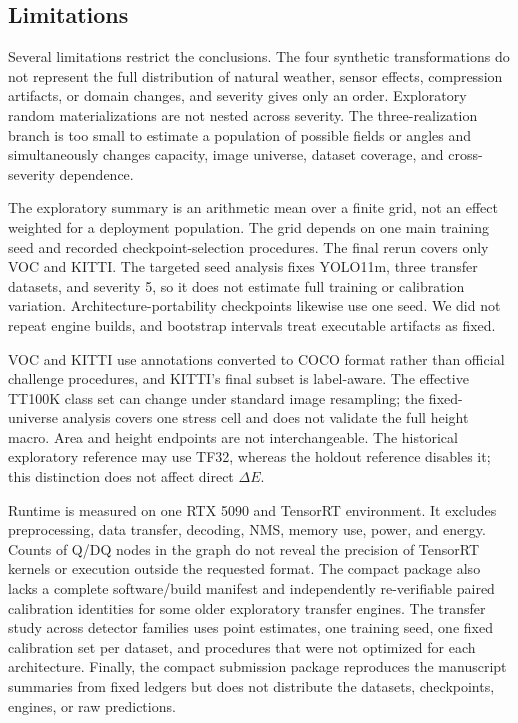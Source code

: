\documentclass[a4paper,fleqn]{cas-dc}
\begin{document}
\subsection{Limitations}

Several limitations restrict the conclusions. The four synthetic transformations do not represent the full distribution of natural weather, sensor effects, compression artifacts, or domain changes, and severity gives only an order. Exploratory random materializations are not nested across severity. The three-realization branch is too small to estimate a population of possible fields or angles and simultaneously changes capacity, image universe, dataset coverage, and cross-severity dependence.

The exploratory summary is an arithmetic mean over a finite grid, not an effect weighted for a deployment population. The grid depends on one main training seed and recorded checkpoint-selection procedures. The final rerun covers only VOC and KITTI. The targeted seed analysis fixes YOLO11m, three transfer datasets, and severity 5, so it does not estimate full training or calibration variation. Architecture-portability checkpoints likewise use one seed. We did not repeat engine builds, and bootstrap intervals treat executable artifacts as fixed.

VOC and KITTI use annotations converted to COCO format rather than official challenge procedures, and KITTI's final subset is label-aware. The effective TT100K class set can change under standard image resampling; the fixed-universe analysis covers one stress cell and does not validate the full height macro. Area and height endpoints are not interchangeable. The historical exploratory reference may use TF32, whereas the holdout reference disables it; this distinction does not affect direct $\Delta E$.

Runtime is measured on one RTX 5090 and TensorRT environment. It excludes preprocessing, data transfer, decoding, NMS, memory use, power, and energy. Counts of Q/DQ nodes in the graph do not reveal the precision of TensorRT kernels or execution outside the requested format. The compact package also lacks a complete software/build manifest and independently re-verifiable paired calibration identities for some older exploratory transfer engines. The transfer study across detector families uses point estimates, one training seed, one fixed calibration set per dataset, and procedures that were not optimized for each architecture. Finally, the compact submission package reproduces the manuscript summaries from fixed ledgers but does not distribute the datasets, checkpoints, engines, or raw predictions.
\end{document}
